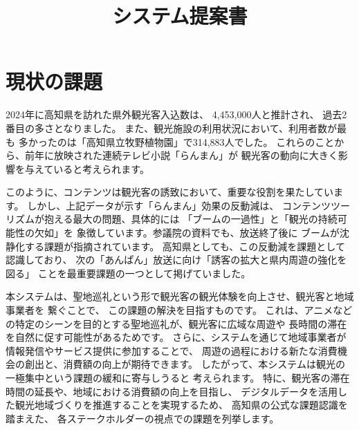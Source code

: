 \documentclass{docs}
\title{システム提案書}
\begin{document}
\section{現状の課題}\label{sec:issues}
2024年に高知県を訪れた県外観光客入込数は、%
4,453,000人と推計され、%
過去2番目の多さとなりました。
また、観光施設の利用状況において、利用者数が最も
多かったのは「高知県立牧野植物園」で314,883人でした\cite{kochi_tourism_stat}。
これらのことから、前年に放映された連続テレビ小説「らんまん」が
観光客の動向に大きく影響を与えていると考えられます。

このように、コンテンツは観光客の誘致において、重要な役割を果たしています。
しかし、上記データが示す「らんまん」効果の反動減は、
コンテンツツーリズムが抱える最大の問題、具体的には
「ブームの一過性」と「観光の持続可能性の欠如」を
象徴しています。参議院の資料\cite{sangiin2012}でも、放送終了後に
ブームが沈静化する課題が指摘されています。
高知県としても、この反動減を課題として認識しており、
次の「あんぱん」放送に向け「誘客の拡大と県内周遊の強化を図る」
ことを最重要課題の一つとして掲げていました\cite{kochi_r7_plan}。

本システムは、聖地巡礼という形で観光客の観光体験を向上させ、観光客と地域事業者を
繋ぐことで、
この課題の解決を目指すものです。
これは、アニメなどの特定のシーンを目的とする聖地巡礼が、観光客に広域な周遊や
長時間の滞在を自然に促す可能性があるためです。
さらに、システムを通じて地域事業者が情報発信やサービス提供に参加することで、
周遊の過程における新たな消費機会の創出と、消費額の向上が期待できます。
したがって、本システムは観光の一極集中という課題の緩和に寄与しうると
考えられます。
特に、観光客の滞在時間の延長や、地域における消費額の向上を目指し、
デジタルデータを活用した観光地域づくりを推進することを実現するため、
高知県の公式な課題認識\cite{kochi_dx_plan}を踏まえた、
各ステークホルダーの視点での課題を列挙します。
\end{document}
